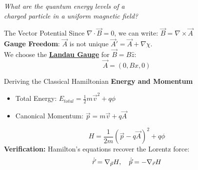 \documentclass[aspectratio=169, 14pt, t]{beamer}
\begin{document}
\begin{frame}{}
    \vfill
    \begin{center}
        \large
        \textit{What are the quantum energy levels of a}\\
        \textit{charged particle in a uniform magnetic field?}
    \end{center}
\end{frame}

\begin{frame}{The Vector Potential}
    Since $\nabla \cdot \vec{B} = 0$, we can write: $\vec{B} = \nabla \times \vec{A}$ \\[0.5cm]
    \textbf{Gauge Freedom}: $\vec{A}$ is not unique $ \vec{A}' = \vec{A} + \nabla\chi $. \\[0.5cm]
    We choose the  \underline{\textbf{Landau Gauge}} for $\vec{B} = B\hat{z}$:
    \[ \vec{A} = (0, Bx, 0) \]
\end{frame}

\begin{frame}{Deriving the Classical Hamiltonian}
    \textbf{Energy and Momentum}
    \begin{itemize}
        \item Total Energy: $E_{total} = \frac{1}{2}m\vec{v}^2 + q\phi$
        \item Canonical Momentum: $\vec{p} = m\vec{v} + q\vec{A}$
    \end{itemize}
    \vspace{0.5cm}
    \[
        H = \frac{1}{2m}(\vec{p} - q\vec{A})^2 + q\phi
    \]
    \vfill
    \textbf{Verification:} Hamilton's equations recover the Lorentz force:
    \[ \dot{\vec{r}} = \nabla_{\vec{p}} H \qc \dot{\vec{p}} = -\nabla_{\vec{r}} H \]
\end{frame}
\end{document}

